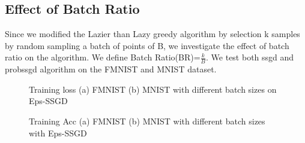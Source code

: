 \documentclass[a4paper,twoside]{iiththesis}
\theoremstyle{definition}
\theoremstyle{definition}
\theoremstyle{remark}
\begin{document}
\subsection{Effect of Batch Ratio}
Since we modified the Lazier than Lazy greedy algorithm by selection k samples by random sampling a batch of points of B, we investigate the effect of batch ratio on the algorithm.
We define Batch Ratio(BR)=$\frac{k}{B}$. We test both ssgd and probssgd algorithm on the FMNIST and MNIST dataset.
\begin{figure}
%
%

\caption{Training loss (a) FMNIST (b) MNIST with different batch sizes on Eps-SSGD}
%
%
    \caption{Training Acc (a) FMNIST (b) MNIST with different batch sizes with Eps-SSGD }
    \label{fig:Emnist Learning Rate Loss}
\end{figure}
\end{document}
